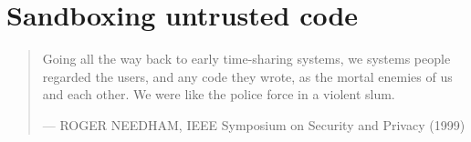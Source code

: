 
\chapter{Sandboxing untrusted code}

\begin{quotation}

\footnotesize\sffamily\itshape

\begin{flushright}

Going all the way back to early time-sharing systems, we systems people
regarded the users, and any code they wrote, as the mortal enemies of us and
each other. We were like the police force in a violent slum.

\smallbreak

\upshape

--- ROGER NEEDHAM, IEEE Symposium on Security and Privacy (1999)

\end{flushright}

\end{quotation}


